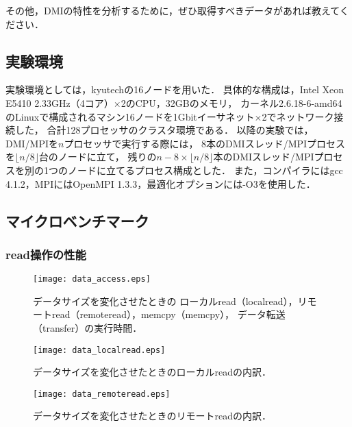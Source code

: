 \documentclass[10pt]{jsarticle}
\begin{document}
その他，DMIの特性を分析するために，ぜひ取得すべきデータがあれば教えてください．

\subsection{実験環境}

実験環境としては，kyutechの16ノードを用いた．
具体的な構成は，Intel Xeon E5410 2.33GHz（4コア）$\times$2のCPU，32GBのメモリ，
カーネル2.6.18-6-amd64のLinuxで構成されるマシン16ノードを1Gbitイーサネット$\times$2でネットワーク接続した，
合計128プロセッサのクラスタ環境である．
以降の実験では，DMI/MPIを$n$プロセッサで実行する際には，
8本のDMIスレッド/MPIプロセスを$\lfloor n/8\rfloor$台のノードに立て，
残りの$n-8\times\lfloor n/8\rfloor$本のDMIスレッド/MPIプロセスを別の1つのノードに立てるプロセス構成とした．
また，コンパイラにはgcc 4.1.2，MPIにはOpenMPI 1.3.3，最適化オプションには-O3を使用した．

\subsection{マイクロベンチマーク}

\subsubsection{read操作の性能}
\label{sec:perform_read}

\begin{figure}
  \centering
  \texttt{[image: data\_access.eps]}
  \caption{データサイズを変化させたときの
    ローカルread（localread），リモートread（remoteread），memcpy（memcpy），
    データ転送（transfer）の実行時間．}
  \label{fig:data_read}
\end{figure}

\begin{figure}
  \centering
  \texttt{[image: data\_localread.eps]}
  \caption{データサイズを変化させたときのローカルreadの内訳．}
  \label{fig:data_localread}
\end{figure}

\begin{figure}
  \centering
  \texttt{[image: data\_remoteread.eps]}
  \caption{データサイズを変化させたときのリモートreadの内訳．}
  \label{fig:data_remoteread}
\end{figure}
\end{document}
